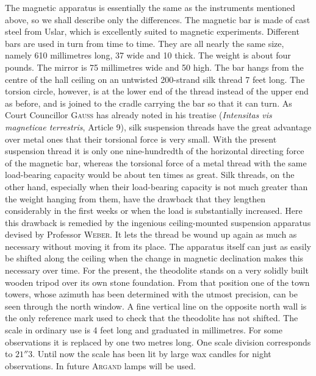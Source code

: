 The magnetic apparatus is essentially the same as the instruments mentioned above, so we shall describe only the differences. The magnetic bar is made of cast steel from Uslar, which is excellently suited to magnetic experiments. Different bars are used in turn from time to time. They are all nearly the same size, namely 610 millimetres long, 37 wide and 10 thick. The weight is about four pounds. The mirror is 75 millimetres wide and 50 high. The bar hangs from the centre of the hall ceiling on an untwisted 200-strand silk thread 7 feet long. The torsion circle, however, is at the lower end of the thread instead of the upper end as before, and is joined to the cradle carrying the bar so that it can turn. As Court Councillor \textsc{Gauss} has already noted in his treatise (\textit{Intensitas vis magneticae terrestris}, Article 9), silk suspension threads have the great advantage over metal ones that their torsional force is very small. With the present suspension thread it is only one nine-hundredth of the horizontal directing force of the magnetic bar, whereas the torsional force of a metal thread with the same load-bearing capacity would be about ten times as great. Silk threads, on the other hand, especially when their load-bearing capacity is not much greater than the weight hanging from them, have the drawback that they lengthen considerably in the first weeks or when the load is substantially increased. Here this drawback is remedied by the ingenious ceiling-mounted suspension apparatus
devised by Professor \textsc{Weber}. It lets the thread be wound up again as much as necessary without moving it from its place. The apparatus itself can just as easily be shifted along the ceiling when the change in magnetic declination makes this necessary over time. For the present, the theodolite stands on a very solidly built wooden tripod over its own stone foundation. From that position one of the town towers, whose azimuth has been determined with the utmost precision, can be seen through the north window. A fine vertical line on the opposite north wall is the only reference mark used to check that the theodolite has not shifted. The scale in ordinary use is 4 feet long and graduated in millimetres. For some observations it is replaced by one two metres long. One scale division corresponds to $21''3$. Until now the scale has been lit by large wax candles for night observations. In future \textsc{Argand} lamps will be used.

